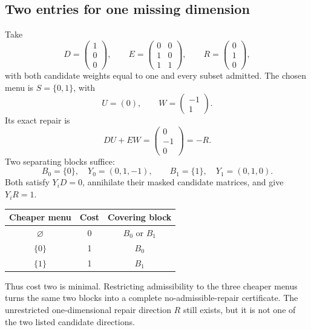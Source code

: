 \subsection{Two entries for one missing dimension}

Take
\[
 D=\begin{pmatrix}1\\0\\0\end{pmatrix},\qquad
 E=\begin{pmatrix}0&0\\1&0\\1&1\end{pmatrix},\qquad
 R=\begin{pmatrix}0\\1\\0\end{pmatrix},
\]
with both candidate weights equal to one and every subset admitted. The chosen menu is $S=\{0,1\}$, with
\[
 U=(0),\qquad W=\begin{pmatrix}-1\\1\end{pmatrix}.
\]
Its exact repair is
\[
 DU+EW=\begin{pmatrix}0\\-1\\0\end{pmatrix}=-R.
\]
Two separating blocks suffice:
\[
 B_0=\{0\},\quad Y_0=(0,1,-1),\qquad
 B_1=\{1\},\quad Y_1=(0,1,0).
\]
Both satisfy $Y_iD=0$, annihilate their masked candidate matrices, and give $Y_iR=1$.

\begin{center}
\begin{tabular}{@{}ccc@{}}\toprule
Cheaper menu & Cost & Covering block\\\midrule
$\varnothing$ & 0 & $B_0$ or $B_1$\\
$\{0\}$ & 1 & $B_0$\\
$\{1\}$ & 1 & $B_1$\\\bottomrule
\end{tabular}
\end{center}
Thus cost two is minimal. Restricting admissibility to the three cheaper menus turns the same two blocks into a complete no-admissible-repair certificate. The unrestricted one-dimensional repair direction $R$ still exists, but it is not one of the two listed candidate directions.


